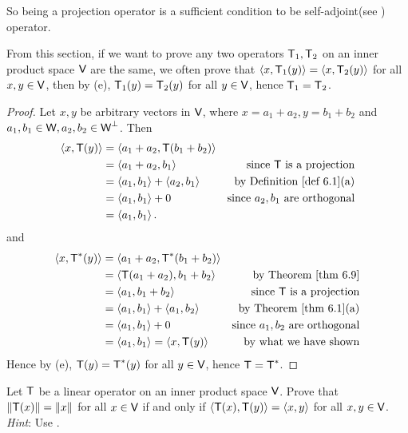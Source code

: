 \begin{note}
So being a projection operator is a sufficient condition to be self-adjoint(see ) operator.
\end{note}

\begin{remark} \label{remark 6.3.8}
From this section, if we want to prove any two operators \(\textsf{T}_1, \textsf{T}_2\) on an inner product space \(\textsf{V}\) are the same, we often prove that \(\left< x, \textsf{T}_1(y) \right> = \left< x, \textsf{T}_2(y) \right>\) for all \(x, y \in \textsf{V}\), then by (e), \(\textsf{T}_1(y) = \textsf{T}_2(y)\) for all \(y \in \textsf{V}\), hence \(\textsf{T}_1 = \textsf{T}_2\).
\end{remark}

\begin{proof}
Let \(x, y\) be arbitrary vectors in \(\textsf{V}\), where \(x = a_1 + a_2, y = b_1 + b_2\) and \(a_1, b_1 \in \textsf{W}, a_2, b_2 \in \textsf{W}^{\perp}\).
Then
\begin{align*}
    \LG x, \T(y) \RG & = \LG a_1 + a_2, \T(b_1 + b_2) \RG \\
        & = \LG a_1 + a_2, b_1 \RG & \text{since \(\T\) is a projection} \\
        & = \LG a_1, b_1 \RG + \LG a_2, b_1 \RG & \text{by \DEF{6.1}(a)} \\
        & = \LG a_1, b_1 \RG + 0 & \text{since \(a_2, b_1\) are orthogonal} \\
        & = \LG a_1, b_1 \RG.
\end{align*}
and
\begin{align*}
    \LG x, \T^*(y) \RG & = \LG a_1 + a_2, \T^*(b_1 + b_2) \RG \\
        & = \LG \T(a_1 + a_2), b_1 + b_2 \RG & \text{by \THM{6.9}} \\
        & = \LG a_1, b_1 + b_2 \RG & \text{since \(\T\) is a projection} \\
        & = \LG a_1, b_1 \RG + \LG a_1, b_2 \RG & \text{by \THM{6.1}(a)} \\
        & = \LG a_1, b_1 \RG + 0 & \text{since \(a_1, b_2\) are orthogonal} \\
        & = \LG a_1, b_1 \RG = \LG x, \T(y) \RG & \text{by what we have shown}
\end{align*}
Hence by (e), \(\textsf{T}(y) = \textsf{T}^*(y)\) for all \(y \in \textsf{V}\), hence \(\textsf{T} = \textsf{T}^*\).
\end{proof}

\begin{exercise} \label{exercise 6.3.10}
Let \(\textsf{T}\) be a linear operator on an inner product space \(\textsf{V}\).
Prove that \(\left\lVert\textsf{T}(x)\right\rVert = \left\lVert x\right\rVert\) for all \(x \in \textsf{V}\) if and only if \(\left< \textsf{T}(x), \textsf{T}(y) \right> = \left< x, y \right>\) for all \(x, y \in \textsf{V}\).
\emph{Hint}: Use .
\end{exercise}


